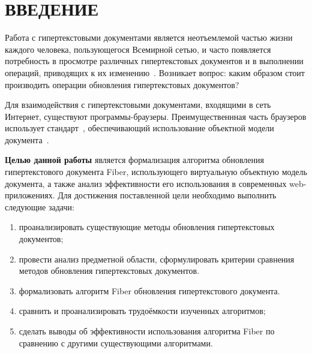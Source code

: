 \section*{ВВЕДЕНИЕ}

Работа с гипертекстовыми документами является неотъемлемой частью жизни каждого человека, пользующегося Всемирной сетью, и часто появляется потребность в просмотре различных гипертекстовых документов и в выполнении операций, приводящих к их изменению~\cite{hypertext-popular}.
Возникает вопрос: каким образом стоит производить операции обновления гипертекстовых документов?

Для взаимодействия с гипертекстовыми документами, входящими в сеть Интернет, существуют программы-браузеры.
Преимущественнная часть браузеров использует стандарт~\cite{dom-doc}, обеспечивающий использование объектной модели документа~\cite{dom}. 


\textbf{Целью данной работы} является формализация алгоритма обновления гипертекстового документа Fiber, использующего виртуальную объектную модель документа, а также анализ эффективности его использования в современных web-приложениях.
Для достижения поставленной цели необходимо выполнить следующие задачи:

\begin{enumerate}[label=\arabic*)]
	\item проанализировать существующие методы обновления гипертекстовых документов;
	\item провести анализ предметной области, сформулировать критерии сравнения методов обновления гипертекстовых документов.
	\item формализовать алгоритм Fiber обновления гипертекстового документа.
	\item сравнить и проанализировать трудоёмкости изученных алгоритмов;
	\item сделать выводы об эффективности использования алгоритма Fiber по сравнению с другими существующими алгоритмами.
\end{enumerate}


\pagebreak